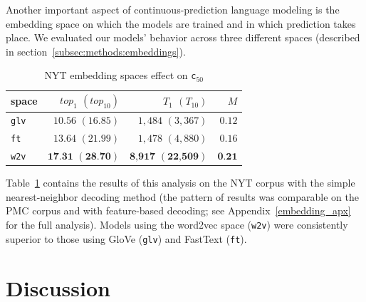 \documentclass[11pt,a4paper]{article}
\begin{document}
Another important aspect of continuous-prediction language modeling is the  embedding space on which the models are trained and in which prediction takes place. We evaluated our models' behavior across three different spaces (described in section~\ref{subsec:methods:embeddings}).
\begin{table}[h]
\begin{center}
\begin{tabular}{lrrr}
space &  $top_{1}$ $(top_{10})$ & $T_{1}$ $(T_{10})$ & $M$ \\ \hline
{\tt glv} & $10.56$ $(16.85)$ & $1,484$ $(3,367)$ & $0.12$  \\
{\tt ft} & $13.64$ $(21.99)$ & $1,478$ $(4,880)$ & $0.16$ \\
{\tt w2v} & $\textbf{17.31}$ $(\textbf{28.70})$ & $\textbf{8,917}$ $(\textbf{22,509})$ & $\textbf{0.21}$ \\
\end{tabular}
\end{center}
\caption{\label{space_50}{NYT embedding spaces effect on \tt c$_{50}$}}
\vspace{-0.15in}
\end{table}

Table~\ref{space_50} contains the results of this analysis on the NYT corpus with the simple nearest-neighbor decoding method (the pattern of results was comparable on the PMC corpus and with feature-based decoding; see Appendix~\ref{embedding_apx} for the full analysis). Models using the word2vec space ({\tt w2v}) were consistently superior to those using GloVe ({\tt glv}) and FastText ({\tt ft}).


\section{Discussion}\label{sec:discussion}
\end{document}
